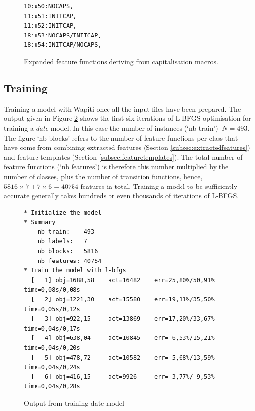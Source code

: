 \begin{figure}
\centering
\begin{BVerbatim}
10:u50:NOCAPS,
11:u51:INITCAP,
11:u52:INITCAP,
18:u53:NOCAPS/INITCAP,
18:u54:INITCAP/NOCAPS,
\end{BVerbatim}
\caption{Expanded feature functions deriving from capitalisation macros.}
\label{fig:expandedfeatures}
\end{figure}

\subsection{Training}

Training a model with Wapiti once all the input files have been prepared. The output given in Figure \ref{fig:output} shows the first six iterations of L-BFGS optimisation for training a \emph{date} model. In this case the number of instances (`nb train'), $N = 493$. The figure `nb blocks' refers to the number of feature functions per class that have come from combining extracted features (Section \ref{subsec:extractedfeatures}) and feature templates (Section \ref{subsec:featuretemplates}). The total number of feature functions (`nb features') is therefore this number multiplied by the number of classes, plus the number of transition functions, hence, $5816 \times 7 + 7 \times 6 = 40754$ features in total. Training a model to be sufficiently accurate generally takes hundreds or even thousands of iterations of L-BFGS.

\begin{figure}
\centering
\begin{BVerbatim}
* Initialize the model
* Summary
    nb train:    493
    nb labels:   7
    nb blocks:   5816
    nb features: 40754
* Train the model with l-bfgs
  [   1] obj=1688,58    act=16482    err=25,80%/50,91% time=0,08s/0,08s
  [   2] obj=1221,30    act=15580    err=19,11%/35,50% time=0,05s/0,12s
  [   3] obj=922,15     act=13869    err=17,20%/33,67% time=0,04s/0,17s
  [   4] obj=638,04     act=10845    err= 6,53%/15,21% time=0,04s/0,20s
  [   5] obj=478,72     act=10582    err= 5,68%/13,59% time=0,04s/0,24s
  [   6] obj=416,15     act=9926     err= 3,77%/ 9,53% time=0,04s/0,28s
\end{BVerbatim}
\caption{Output from training date model}
\label{fig:output}
\end{figure}
